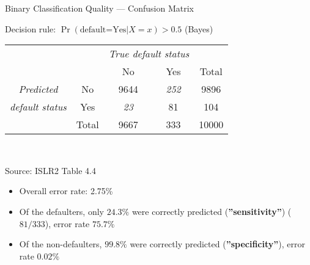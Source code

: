 \documentclass[ignorenonframetext,xcolor=x11names]{beamer}
\begin{document}
\begin{frame}{Binary Classification Quality --- Confusion Matrix}

\begin{block}{}
\begin{center}
\renewcommand{\arraystretch}{1.25}

Decision rule: $\Pr(\text{default=Yes} | X=x) > 0.5$ (Bayes) \\ \vspace{2mm}
\begin{tabular}{cc|cc|c} \hline
     & & \multicolumn{2}{c|}{\emph{True default status}} \\
     & & No & Yes & Total \\ \hline
\emph{Predicted} & No & 9644 & \emph{252} & 9896 \\ 
\emph{default status} & Yes & \emph{23} & 81 & 104 \\ \hline
     & Total & 9667 & 333 & 10000 \\ \hline
\end{tabular} \\
\end{center}
\scriptsize Source: ISLR2 Table 4.4
\end{block}

\begin{itemize}
  \item Overall error rate: 2.75\%
  \item Of the defaulters, only $24.3\%$ were correctly predicted (\textbf{''sensitivity''}) ($81/333$), error rate $75.7\%$
  \item Of the non-defaulters, $99.8\%$ were correctly predicted (\textbf{''specificity''}), error rate $0.02\%$
\end{itemize}
\end{frame}
\end{document}
